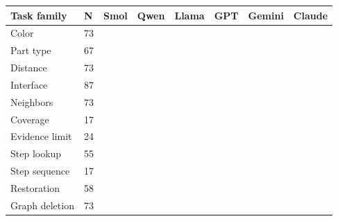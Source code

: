 \begin{tabular}{llrrrrrr}
\toprule
Task family & N & Smol & Qwen & Llama & GPT & Gemini & Claude\\\midrule
Color & 73 &  &  &  &  &  & \\
Part type & 67 &  &  &  &  &  & \\
Distance & 73 &  &  &  &  &  & \\
Interface & 87 &  &  &  &  &  & \\
Neighbors & 73 &  &  &  &  &  & \\
Coverage & 17 &  &  &  &  &  & \\
Evidence limit & 24 &  &  &  &  &  & \\
Step lookup & 55 &  &  &  &  &  & \\
Step sequence & 17 &  &  &  &  &  & \\
Restoration & 58 &  &  &  &  &  & \\
Graph deletion & 73 &  &  &  &  &  & \\
\bottomrule
\end{tabular}
